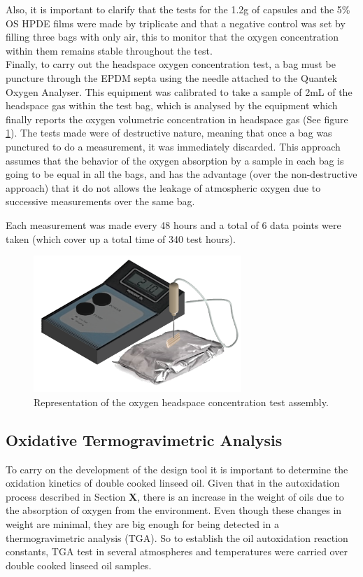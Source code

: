 \begin{refsection}
Also, it is important to clarify that the tests for the 1.2g of capsules and the 5\% OS HPDE films were made by triplicate and that a negative control was set by filling three bags with only air, this to monitor that the oxygen concentration within them remains stable throughout the test. \\

Finally, to carry out the headspace oxygen concentration test, a bag must be puncture through the EPDM septa using the needle attached to the Quantek Oxygen Analyser. This equipment was calibrated to take a sample of 2mL of the headspace gas within the test bag, which is analysed by the equipment which finally  reports the oxygen volumetric concentration in headspace gas (See figure \ref{fig:headspace_test_image}). The tests made were of destructive nature, meaning that once a bag was punctured to do a measurement, it was immediately discarded. This approach assumes that the behavior of the oxygen absorption by a sample in each bag is going to be equal in all the bags, and has the advantage (over the non-destructive approach) that it do not allows the leakage of atmospheric oxygen due to successive measurements over the same bag. 


Each measurement was made every 48 hours and a total of 6 data points were taken (which cover up a total time of 340 test hours).

\begin{figure}[h]
    \centering
    \includegraphics[width=0.7\textwidth]{Documento_Latex/Tesis 2/Imagenes/Headspace_test.png}
    \caption{Representation of the oxygen headspace concentration test assembly.}
    \label{fig:headspace_test_image}
\end{figure}
 
\subsection[Oxidative TGA]{Oxidative Termogravimetric Analysis}\label{sec:TGA} 
To carry on the development of the design tool it is important to determine the oxidation kinetics of double cooked linseed oil. Given that in the autoxidation
process described in Section \textbf{X}, there is an increase in the weight of oils due to the absorption of oxygen from the environment. Even though these changes in weight are minimal, they are big enough for being detected in a thermogravimetric analysis (TGA). So to establish the oil autoxidation reaction constants, TGA test in several atmospheres and temperatures were carried over double cooked linseed oil samples.\\



\end{refsection}

